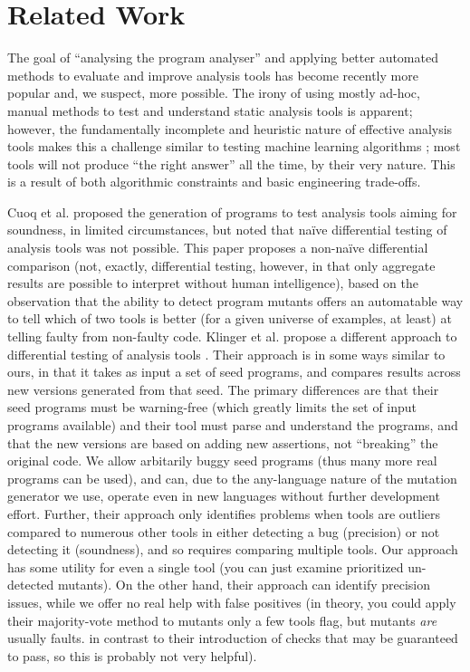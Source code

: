 \section{Related Work}

The goal of ``analysing the program analyser'' \cite{cadar2016analysing} and applying better automated methods to evaluate and improve analysis tools has become recently more popular and, we suspect, more possible.  The irony of using mostly ad-hoc, manual methods to test and understand static analysis tools is apparent; however, the fundamentally incomplete and heuristic nature of effective analysis tools makes this a challenge similar to testing machine learning algorithms \cite{OnlyOracle}; most tools will not produce ``the right answer'' all the time, by their very nature.  This is a result of both algorithmic constraints and basic engineering trade-offs.

Cuoq et al. \cite{regehrRandom} proposed the generation of programs to test analysis tools aiming for soundness, in limited circumstances, but noted that na\"ive differential testing of analysis tools was not possible.  This paper proposes a non-na\"ive differential comparison (not, exactly, differential testing, however, in that only aggregate results are possible to interpret without human intelligence), based on the observation that the ability to detect program mutants offers an automatable way to tell which of two tools is better (for a given universe of examples, at least) at telling faulty from non-faulty code.  Klinger et al. propose a different approach to differential testing of analysis tools \cite{klinger2019differentially}.  Their approach is in some ways similar to ours, in that it takes as input a set of seed programs, and compares results across new versions generated from that seed.  The primary differences are that their seed programs must be warning-free (which greatly limits the set of input programs available) and their tool must parse and understand the programs, and that the new versions are based on adding new assertions, not ``breaking'' the original code.  We allow arbitarily buggy seed programs (thus many more real programs can be used), and can, due to the any-language nature of the mutation generator we use, operate even in new languages without further development effort.  Further, their approach only identifies problems when tools are outliers compared to numerous other tools in either detecting a bug (precision) or not detecting it (soundness), and so requires comparing multiple tools.  Our approach has some utility for even a single tool (you can just examine prioritized un-detected mutants).  On the other hand, their approach can identify precision issues, while we offer no real help with false positives (in theory, you could apply their majority-vote method to mutants only a few tools flag, but mutants \emph{are} usually faults. in contrast to their introduction of checks that may be guaranteed to pass, so this is probably not very helpful).